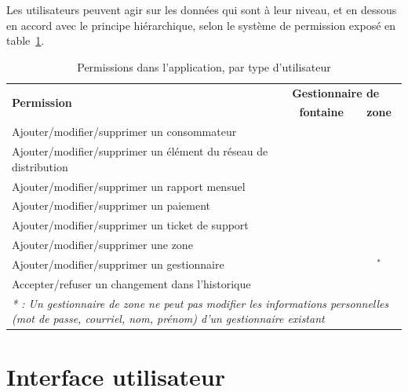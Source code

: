 \documentclass{EPL-master-thesis-covers-FR}
\newcommand{\cmark}{\ding{51}}%
\newcommand{\xmark}{\ding{55}}%
\begin{document}
				Les utilisateurs peuvent agir sur les données qui sont à leur niveau, et en dessous en accord avec le principe hiérarchique, selon le système de permission exposé en table~\ref{tab:permissions}.
				\begin{table}[H]
					\centering
					\small
					\setlength\tabcolsep{2pt}
					\begin{tabular}{|l|c|c|}
						\hline
						\multirow{2}{*}{\textbf{Permission}} & \multicolumn{2}{l|}{\textbf{Gestionnaire de}} \\ \cline{2-3}
						 & \textbf{fontaine} & \textbf{zone} \\ \hline
						 Ajouter/modifier/supprimer un consommateur & \cmark & \cmark \\ \hline
						 Ajouter/modifier/supprimer un élément du réseau de distribution & \cmark & \cmark \\ \hline
						 Ajouter/modifier/supprimer un rapport mensuel & \cmark & \cmark \\ \hline
						 Ajouter/modifier/supprimer un paiement & \cmark & \cmark \\ \hline
						 Ajouter/modifier/supprimer un ticket de support & \cmark & \cmark \\ \hline
						 Ajouter/modifier/supprimer une zone & \xmark & \cmark \\ \hline
						 Ajouter/modifier/supprimer un gestionnaire & \xmark & \cmark$^{*}$ \\ \hline
						 Accepter/refuser un changement dans l'historique & \xmark & \cmark \\ \hline
						 \multicolumn{3}{p{\textwidth}}{\emph{* : Un gestionnaire de zone ne peut pas modifier les informations personnelles (mot de passe, courriel, nom, prénom) d'un gestionnaire existant}} \\
					\end{tabular}
					\caption{Permissions dans l'application, par type d'utilisateur}
					\label{tab:permissions}
				\end{table}



		\section{Interface utilisateur}

\end{document}
